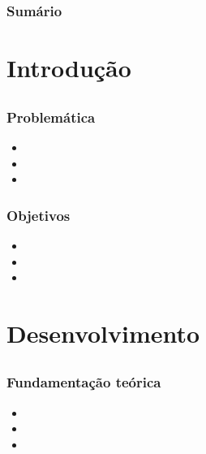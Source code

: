 \documentclass[aspectratio=169]{beamer} %
\begin{document}
\begin{frame}
	\frametitle{Sumário}
  	\tableofcontents
\end{frame}


\section{Introdução}
\subsection*{}

\begin{frame}
	\frametitle{Problemática}

	\begin{itemize}
		\item
		\item
		\item
	\end{itemize}
\end{frame}

\begin{frame}
	\frametitle{Objetivos}

	\begin{itemize}
		\item
		\item
		\item
	\end{itemize}
\end{frame}

\section{Desenvolvimento}
\subsection*{}

\begin{frame}
	\frametitle{Fundamenta\c cão teórica}

	\begin{itemize}
		\item
		\item
		\item
	\end{itemize}
\end{frame}
\end{document}
